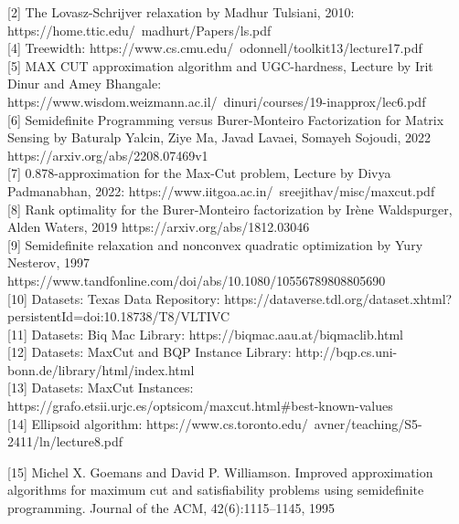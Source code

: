 \documentclass{article}
\begin{document}
[2] The Lovasz-Schrijver relaxation by Madhur Tulsiani, 2010: 
https://home.ttic.edu/~madhurt/Papers/ls.pdf \\


[4] Treewidth: 
https://www.cs.cmu.edu/~odonnell/toolkit13/lecture17.pdf\\

[5] MAX CUT approximation algorithm and UGC-hardness, Lecture by Irit Dinur and Amey Bhangale:
https://www.wisdom.weizmann.ac.il/~dinuri/courses/19-inapprox/lec6.pdf \\

[6] Semidefinite Programming versus Burer-Monteiro Factorization for Matrix
Sensing by Baturalp Yalcin, Ziye Ma, Javad Lavaei, Somayeh Sojoudi, 2022
https://arxiv.org/abs/2208.07469v1\\

[7] 0.878-approximation for the Max-Cut problem, Lecture by Divya Padmanabhan, 2022: https://www.iitgoa.ac.in/~sreejithav/misc/maxcut.pdf\\

[8] Rank optimality for the Burer-Monteiro factorization by Irène Waldspurger, Alden Waters, 2019 
https://arxiv.org/abs/1812.03046\\

[9] Semidefinite relaxation and nonconvex quadratic optimization by Yury Nesterov, 1997
https://www.tandfonline.com/doi/abs/10.1080/10556789808805690\\

[10] Datasets: Texas Data Repository:
https://dataverse.tdl.org/dataset.xhtml?persistentId=doi:10.18738/T8/VLTIVC\\  

[11] Datasets: Biq Mac Library:
https://biqmac.aau.at/biqmaclib.html\\ 

[12] Datasets: MaxCut and BQP Instance Library:
http://bqp.cs.uni-bonn.de/library/html/index.html\\ 

[13] Datasets: MaxCut Instances:
https://grafo.etsii.urjc.es/optsicom/maxcut.html#best-known-values\\

[14] Ellipsoid algorithm: https://www.cs.toronto.edu/~avner/teaching/S5-2411/ln/lecture8.pdf

[15] Michel X. Goemans and David P. Williamson. Improved approximation algorithms for maximum cut and satisfiability problems using semidefinite programming. Journal of the ACM, 42(6):1115–1145, 1995
\end{document}
